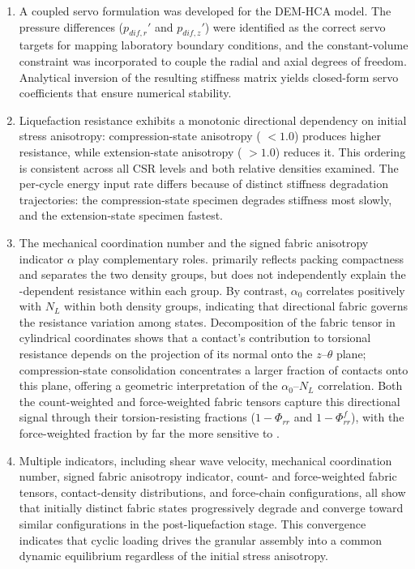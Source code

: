 \documentclass[../main]{subfiles}
\begin{document}
\begin{enumerate}
\item A coupled servo formulation was developed for the DEM-HCA model. The pressure differences ($p_{dif,r}'$ and $p_{dif,z}'$) were identified as the correct servo targets for mapping laboratory boundary conditions, and the constant-volume constraint was incorporated to couple the radial and axial degrees of freedom. Analytical inversion of the resulting stiffness matrix yields closed-form servo coefficients that ensure numerical stability.

\item Liquefaction resistance exhibits a monotonic directional dependency on initial stress anisotropy: compression-state anisotropy (\Kzero{} $< 1.0$) produces higher resistance, while extension-state anisotropy (\Kzero{} $> 1.0$) reduces it. This ordering is consistent across all CSR levels and both relative densities examined. The per-cycle energy input rate differs because of distinct stiffness degradation trajectories: the compression-state specimen degrades stiffness most slowly, and the extension-state specimen fastest.

\item The mechanical coordination number \Zm{} and the signed fabric anisotropy indicator $\alpha$ play complementary roles. \Zm{} primarily reflects packing compactness and separates the two density groups, but does not independently explain the \Kzero{}-dependent resistance within each group. By contrast, $\alpha_0$ correlates positively with $N_L$ within both density groups, indicating that directional fabric governs the resistance variation among \Kzero{} states. Decomposition of the fabric tensor in cylindrical coordinates shows that a contact's contribution to torsional resistance depends on the projection of its normal onto the $z$--$\theta$ plane; compression-state consolidation concentrates a larger fraction of contacts onto this plane, offering a geometric interpretation of the $\alpha_0$--$N_L$ correlation. Both the count-weighted and force-weighted fabric tensors capture this directional signal through their torsion-resisting fractions ($1 - \Phi_{rr}$ and $1 - \Phi^f_{rr}$), with the force-weighted fraction by far the more sensitive to \Kzero{}.

\item Multiple indicators, including shear wave velocity, mechanical coordination number, signed fabric anisotropy indicator, count- and force-weighted fabric tensors, contact-density distributions, and force-chain configurations, all show that initially distinct fabric states progressively degrade and converge toward similar configurations in the post-liquefaction stage. This convergence indicates that cyclic loading drives the granular assembly into a common dynamic equilibrium regardless of the initial stress anisotropy.
\end{enumerate}
\end{document}
